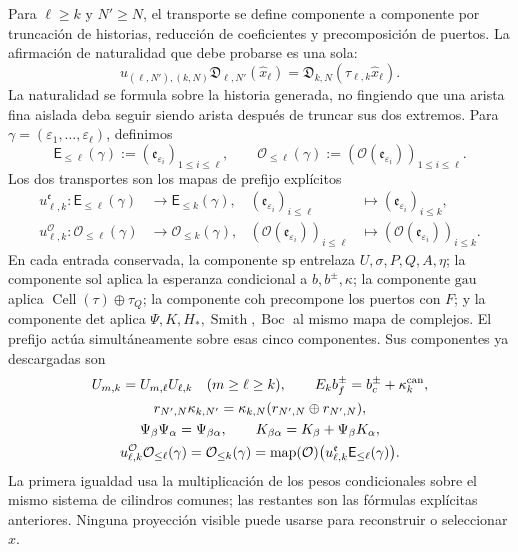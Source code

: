 Para \(\ell\geq k\) y \(N'\geq N\), el transporte se define componente a
componente por truncación de historias, reducción de coeficientes y
precomposición de puertos. La afirmación de naturalidad que debe probarse es
una sola:
\begin{equation}
\label{eq:pdfv2-cor-naturalidad-unica}
 u_{(\ell,N'),(k,N)}\mathfrak D_{\ell,N'}(\widehat x_\ell)
 =\mathfrak D_{k,N}(\tau_{\ell,k}\widehat x_\ell).
\end{equation}
La naturalidad se formula sobre la historia generada, no fingiendo que una
arista fina aislada deba seguir siendo arista después de truncar sus dos
extremos. Para
\(\gamma=(\varepsilon_1,\ldots,\varepsilon_\ell)\), definimos
\[
 \mathsf E_{\leq\ell}(\gamma)
 :=(\mathfrak e_{\varepsilon_i})_{1\leq i\leq\ell},
 \qquad
 \mathcal O_{\leq\ell}(\gamma)
 :=(\mathcal O(\mathfrak e_{\varepsilon_i}))_{1\leq i\leq\ell}.
\]
Los dos transportes son los mapas de prefijo explícitos
\begin{align}
 u^{\mathfrak e}_{\ell,k}:
 \mathsf E_{\leq\ell}(\gamma)&\longrightarrow
 \mathsf E_{\leq k}(\gamma),&
 (\mathfrak e_{\varepsilon_i})_{i\leq\ell}
 &\longmapsto(\mathfrak e_{\varepsilon_i})_{i\leq k},
 \label{eq:pdfv2-cor-transporte-arista}\\
 u^{\mathcal O}_{\ell,k}:
 \mathcal O_{\leq\ell}(\gamma)&\longrightarrow
 \mathcal O_{\leq k}(\gamma),&
 (\mathcal O(\mathfrak e_{\varepsilon_i}))_{i\leq\ell}
 &\longmapsto
 (\mathcal O(\mathfrak e_{\varepsilon_i}))_{i\leq k}.
 \label{eq:pdfv2-cor-transporte-accion}
\end{align}
En cada entrada conservada, la componente \(\mathrm{sp}\) entrelaza
\(U,\sigma,P,Q,A,\eta\); la componente \(\mathrm{sol}\) aplica la esperanza
condicional a \(b,b^\pm,\kappa\); la componente \(\mathrm{gau}\) aplica
\(\operatorname{Cell}(\tau)\oplus\tau_Q\); la componente \(\mathrm{coh}\)
precompone los puertos con \(F\); y la componente \(\mathrm{det}\) aplica
\(\Psi,K,H_*,\operatorname{Smith},\operatorname{Boc}\) al mismo mapa de
complejos. El prefijo actúa simultáneamente sobre esas cinco componentes.
Sus componentes ya descargadas son
\begin{equation}
\label{eq:pdfv2-cor-naturalidad-componentes}
 \begin{gathered}
 U_{m,k}=U_{m,\ell}U_{\ell,k}\quad(m\geq\ell\geq k),\qquad
 E_kb_f^\pm=b_c^\pm+\kappa_k^{\rm can},\\
 r_{N',N}\kappa_{k,N'}=
 \kappa_{k,N}(r_{N',N}\oplus r_{N',N}),\\
 \Psi_\beta\Psi_\alpha=\Psi_{\beta\alpha},
 \qquad K_{\beta\alpha}=K_\beta+\Psi_\beta K_\alpha,\\
 u^{\mathcal O}_{\ell,k}\mathcal O_{\leq\ell}(\gamma)
 =\mathcal O_{\leq k}(\gamma)
 =\operatorname{map}(\mathcal O)\bigl(u^{\mathfrak e}_{\ell,k}
                    \mathsf E_{\leq\ell}(\gamma)\bigr).
 \end{gathered}
\end{equation}
La primera igualdad usa la multiplicación de los pesos condicionales sobre el mismo
sistema de cilindros comunes; las restantes son las fórmulas explícitas
anteriores. Ninguna proyección visible
puede usarse para reconstruir o seleccionar \(\widehat x\).

